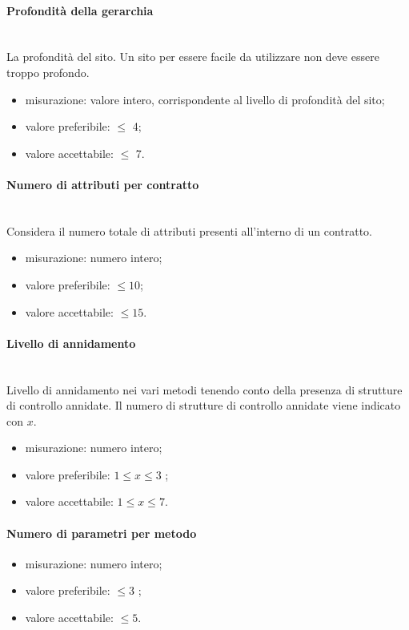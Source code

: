 			\paragraph*{Profondità della gerarchia} \mbox{}\\
			La profondità del sito. Un sito per essere facile da utilizzare non deve essere troppo profondo.
			\begin{itemize}
				\item misurazione: valore intero, corrispondente al livello di profondità del sito;
				\item valore preferibile: $\leq$ 4;
				\item valore accettabile: $\leq$ 7.
			\end{itemize}
		
			\paragraph*{Numero di attributi per contratto}
			\mbox{}\\
			Considera il numero totale di attributi presenti
			all'interno di un contratto.
			\begin{itemize}
				\item misurazione: numero intero;
				\item valore preferibile: $\leq 10$;
				\item valore accettabile: $\leq 15$.
			\end{itemize}
		
			\paragraph*{Livello di annidamento}
			\mbox{}\\
			Livello di annidamento nei vari metodi tenendo conto della
			presenza di strutture di controllo annidate. Il numero di strutture di controllo annidate viene indicato con $x$.
			\begin{itemize}
				\item misurazione: numero intero;
				\item valore preferibile: $ 1 \leq x \leq3$ ;
				\item valore accettabile: $1 \leq x\leq 7$.
			\end{itemize}
	
		
			\paragraph*{Numero di parametri per metodo}
			\begin{itemize}
				\item misurazione: numero intero;
				\item valore preferibile: $ \leq 3$ ;
				\item valore accettabile: $ \leq 5$.
			\end{itemize}
			
